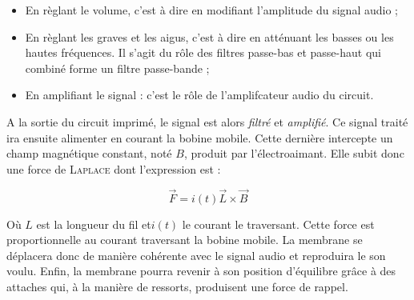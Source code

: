 \begin{itemize}
	\item En règlant le volume, c'est à dire en modifiant l'amplitude du signal audio ;
	\item En règlant les graves et les aigus, c'est à dire en atténuant les basses ou les hautes
	fréquences. Il s'agit du rôle des filtres passe-bas et passe-haut qui combiné forme un filtre 
	passe-bande ;
	\item En amplifiant le signal : c'est le rôle de l'amplifcateur audio du circuit.
\end{itemize}

A la sortie du circuit imprimé, le signal est alors \textit{filtré} et \textit{amplifié}.
Ce signal traité ira ensuite alimenter en courant la bobine mobile. Cette 
dernière intercepte un champ magnétique constant, noté $B$, produit par l'électroaimant.
Elle subit donc une force de \textsc{Laplace} dont l'expression est :

$$\vec{F} = i(t)\vec{L}\times{\vec{B}}$$ 

Où $L$ est la longueur du fil et$i(t)$ le courant le traversant. Cette force est proportionnelle
au courant traversant
la bobine mobile. La membrane se déplacera donc de manière cohérente avec le signal audio
et reproduira le son voulu. Enfin, la membrane pourra revenir à son position d'équilibre
grâce à des attaches qui, à la manière de ressorts, produisent une force de rappel.

